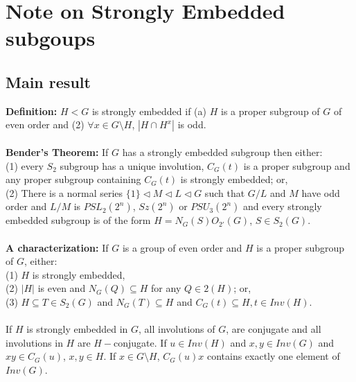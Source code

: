 \chapter{Note on Strongly Embedded subgoups}
\section {Main result} 
{\bf Definition:} $H<G$ is strongly embedded if (a) $H$  is a proper subgroup of $G$ of even order and
(2) $\forall x \in G \setminus H$, $|H \cap H^x|$ is odd.
\\
\\
{\bf Bender's Theorem:} If $G$ has a strongly embedded subgroup then either:
\\
(1) every $S_2$ subgroup has a unique involution, $C_G(t)$ is a proper subgroup and any
proper subgroup containing $C_G(t)$ is strongly embedded; or,
\\
(2) There is a normal series $\{1\} \lhd M \lhd L \lhd G$ such that $G/L$ and $M$ have odd order and
$L/M$ is $PSL_2(2^n)$, $Sz(2^n)$ or $PSU_3(2^n)$ and every strongly embedded subgroup is of the form
$H = N_G(S)O_{2'}(G)$, $S \in S_2(G)$.
\\
\\
{\bf A characterization:}  If $G$ is a group of even order and $H$ is a proper subgroup of $G$, either:
\\
(1) $H$ is strongly embedded,
\\
(2) $|H|$ is even and $N_G(Q) \subseteq H$ for any $Q \in 2(H)$; or,
\\
(3) $H \subseteq T \in S_2(G)$ and $N_G(T) \subseteq H$ and $C_G(t) \subseteq H, t \in Inv(H)$.
\\
\\
If $H$ is strongly embedded in $G$, all involutions of $G$, are conjugate and all involutions in $H$
are $H-$conjugate.  If $u \in Inv(H)$ and $x,y \in Inv(G)$ and $xy \in C_G(u)$, $x,y \in H$.  If
$x \in G \setminus H$,  $C_G(u)x$ contains exactly one element of $Inv(G)$.


